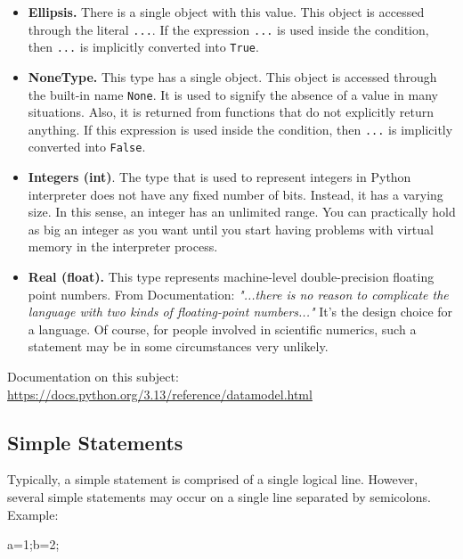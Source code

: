 \documentclass[
]{article}
\newenvironment{Shaded}{}{}
\newcommand{\DecValTok}[1]{\textcolor[rgb]{0.25,0.63,0.44}{#1}}
\newcommand{\NormalTok}[1]{#1}
\newcommand{\OperatorTok}[1]{\textcolor[rgb]{0.40,0.40,0.40}{#1}}
\begin{document}
\begin{itemize}
\item
  \textbf{Ellipsis.} There is a single object with this value. This
  object is accessed through the literal \texttt{...}. If the expression
  \texttt{...} is used inside the condition, then \texttt{...} is
  implicitly converted into \texttt{True}.
\item
  \textbf{NoneType.} This type has a single object. This object is
  accessed through the built-in name \texttt{None}. It is used to
  signify the absence of a value in many situations. Also, it is
  returned from functions that do not explicitly return anything. If
  this expression is used inside the condition, then \texttt{...} is
  implicitly converted into \texttt{False}.
\item
  \textbf{Integers (int)}. The type that is used to represent integers
  in Python interpreter does not have any fixed number of bits. Instead,
  it has a varying size. In this sense, an integer has an unlimited
  range. You can practically hold as big an integer as you want until
  you start having problems with virtual memory in the interpreter
  process.
\item
  \textbf{Real (float).} This type represents machine-level
  double-precision floating point numbers. From Documentation:
  \emph{"...there is no reason to complicate the language with two kinds
  of floating-point numbers..."} It's the design choice for a language.
  Of course, for people involved in scientific numerics, such a
  statement may be in some circumstances very unlikely.
\end{itemize}

Documentation on this subject:
\url{https://docs.python.org/3.13/reference/datamodel.html}

\hypertarget{simple-statements}{%
\subsection{Simple Statements}\label{simple-statements}}

Typically, a simple statement is comprised of a single logical line.
However, several simple statements may occur on a single line separated
by semicolons. Example:

\begin{Shaded}
\begin{Highlighting}[]
\NormalTok{a}\OperatorTok{=}\DecValTok{1}\OperatorTok{;}\NormalTok{b}\OperatorTok{=}\DecValTok{2}\OperatorTok{;}
\end{Highlighting}
\end{Shaded}
\end{document}
